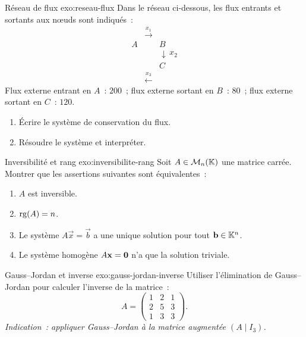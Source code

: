 \begin{exercise}{Réseau de flux \intermediate}{exo:reseau-flux}
  Dans le réseau ci-dessous, les flux entrants et sortants aux n\oe{}uds
  sont indiqués~:
  \[
    \begin{array}{ccc}
      & \xrightarrow{x_1} & \\[-3pt]
      A & & B\\[-3pt]
      & & \downarrow\, x_2\\[-3pt]
      & & C\\[-3pt]
      & \xleftarrow{x_3} &
    \end{array}
  \]
  Flux externe entrant en $A$~: $200$~; flux externe sortant en $B$~: $80$~;
  flux externe sortant en $C$~: $120$.
  \begin{enumerate}[label=(\alph*)]
    \item Écrire le système de conservation du flux.
    \item Résoudre le système et interpréter.
  \end{enumerate}
\end{exercise}

\begin{exercise}{Inversibilité et rang \intermediate}{exo:inversibilite-rang}
  Soit $A\in\mathcal{M}_n({\mathbb{K}})$ une matrice carrée. Montrer que les assertions
  suivantes sont équivalentes~:
  \begin{enumerate}[label=(\roman*)]
    \item $A$ est inversible.
    \item $\operatorname{rg}(A)=n$.
    \item Le système $A\vec{x}=\vec{b}$ a une unique solution pour tout
      $\mathbf{b}\in{\mathbb{K}}^n$.
    \item Le système homogène $A\mathbf{x}=\mathbf{0}$ n'a que la solution triviale.
  \end{enumerate}
\end{exercise}

\begin{exercise}{Gauss--Jordan et inverse \challenging}{exo:gauss-jordan-inverse}
  Utiliser l'élimination de Gauss--Jordan pour calculer l'inverse de la
  matrice~:
  \[
    A=\begin{pmatrix}
      1 & 2 & 1\\
      2 & 5 & 3\\
      1 & 3 & 3
    \end{pmatrix}.
  \]
  \textit{Indication~: appliquer Gauss--Jordan à la matrice augmentée
  $(A\mid I_3)$.}
\end{exercise}

